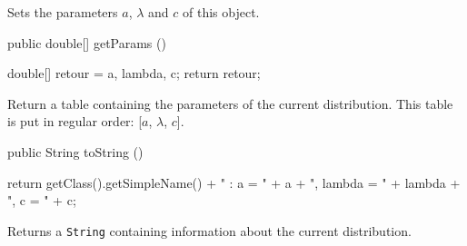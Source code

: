 \begin{tabb} Sets the parameters $a$, $\lambda$ and $c$ of this object.
\end{tabb}
\begin{htmlonly}
\end{htmlonly}
\begin{code}

   public double[] getParams ()\begin{hide} {
      double[] retour = {a, lambda, c};
      return retour;
   }\end{hide}
\end{code}
\begin{tabb}
   Return a table containing the parameters of the current distribution.
   This table is put in regular order: [$a$, $\lambda$, $c$].
\end{tabb}
\begin{htmlonly}
\end{htmlonly}
\begin{code}

   public String toString ()\begin{hide} {
      return getClass().getSimpleName() + " : a = " + a + ", lambda = " + lambda
                                  + ", c = " + c;
   }\end{hide}
\end{code}
\begin{tabb}
   Returns a \texttt{String} containing information about the current distribution.
\end{tabb}
\begin{htmlonly}
\end{htmlonly}
\begin{code}\begin{hide}
}\end{hide}
\end{code}

